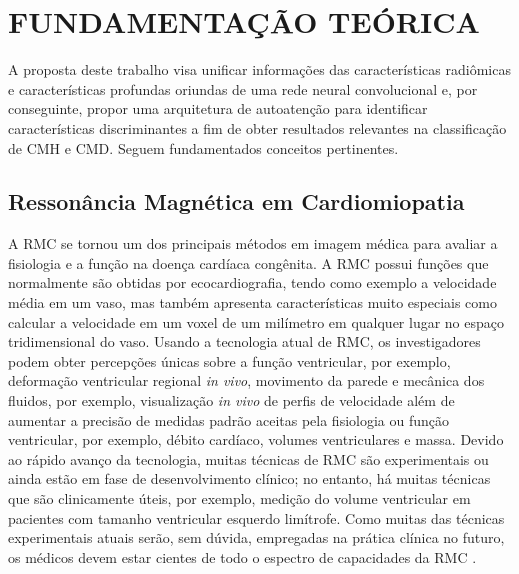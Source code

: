 \chapter{FUNDAMENTAÇÃO TEÓRICA}
\label{chap:fundamentacao_teorica}

A proposta deste trabalho visa unificar informações das características radiômicas e características profundas oriundas de uma rede neural convolucional e, por conseguinte, propor uma arquitetura de autoatenção para identificar características discriminantes a fim de obter resultados relevantes na classificação de \gls{CMH} e \gls{CMD}. Seguem fundamentados conceitos pertinentes.

\section{Ressonância Magnética em Cardiomiopatia}
\label{sec:rmc}

A \gls{RMC} se tornou um dos principais métodos em imagem médica para avaliar a fisiologia e a função na doença cardíaca congênita. A \gls{RMC} possui funções que normalmente são obtidas por ecocardiografia, tendo como exemplo a velocidade média em um vaso, mas também apresenta características muito especiais como calcular a velocidade em um voxel de um milímetro em qualquer lugar no espaço tridimensional do vaso.
Usando a tecnologia atual de \gls{RMC}, os investigadores podem obter percepções únicas sobre a função ventricular, por exemplo, deformação ventricular regional \textit{in vivo}, movimento da parede e mecânica dos fluidos, por exemplo, visualização \textit{in vivo} de perfis de velocidade além de aumentar a precisão de medidas padrão aceitas pela fisiologia ou função ventricular, por exemplo, débito cardíaco, volumes ventriculares e massa. Devido ao rápido avanço da tecnologia, muitas técnicas de \gls{RMC} são experimentais ou ainda estão em fase de desenvolvimento clínico; no entanto, há muitas técnicas que são clinicamente úteis, por exemplo, medição do volume ventricular em pacientes com tamanho ventricular esquerdo limítrofe. Como muitas das técnicas experimentais atuais serão, sem dúvida, empregadas na prática clínica no futuro, os médicos devem estar cientes de todo o espectro de capacidades da \gls{RMC} \cite{fogelAssessmentCardiacFunction2000}.

